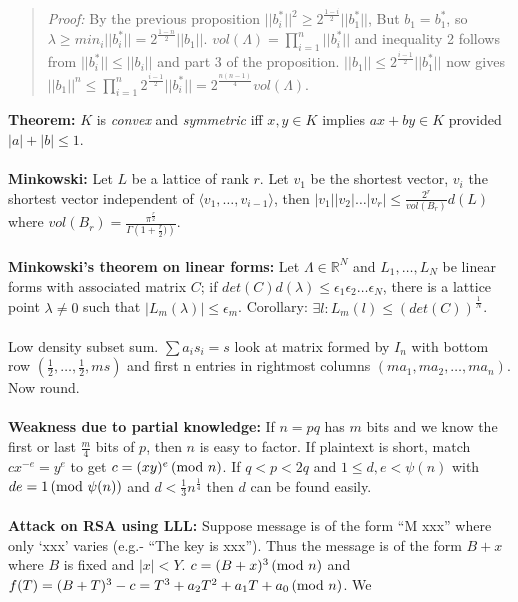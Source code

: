 \begin{quote}
\emph{Proof: }
By the previous proposition $||b_i^*||^2\geq2^{\frac {1-i} 2} ||b_1^*||$,  But $b_1 = b_1^*$,
so $\lambda \geq min_i ||b_i^*|| = 2^{\frac {1-n} 2} ||b_1||$.  $vol(\Lambda) = \prod_{i=1}^n ||b_i^*||$
and inequality 2 follows from $||b_i^*|| \leq ||b_i||$ and part 3 of the proposition.
$||b_1|| \leq 2^{\frac {i-1} 2} ||b_1^*||$ now gives
$||b_1||^n \leq \prod_{i=1}^n 2^{\frac {i-1} 2} ||b_i^*|| = 2^{\frac {n(n-1)} 4} vol(\Lambda)$.
\end{quote}
{\bf Theorem: }
$K$ is \emph{convex} and \emph{symmetric} iff $x, y \in K$
implies
$ax+by \in K$ provided $|a| + |b| \leq 1$.
\\
\\
{\bf Minkowski: } Let $L$ be a lattice of rank $r$.  Let $v_1$ be the shortest
vector,
$v_i$ the shortest vector independent of $\langle v_1, \ldots , v_{i-1} \rangle$, then
$|v_1 | |v_2 | \ldots |v_r | \leq {\frac {2^r} {vol(B_r)}} d(L)$ where
$vol(B_r)= {\frac {\pi^{\frac r 2}} {\Gamma(1+{\frac r 2)})}}$.
\\
\\
{\bf Minkowski's theorem on linear forms: }  Let $\Lambda \in
{\mathbb R}^N$ and $L_1, \ldots , L_N$ be linear forms with associated
matrix $C$;
if $det(C)d(\lambda) \leq \epsilon_1 \epsilon_2 \ldots \epsilon_N$,
there is a lattice point $\lambda \ne 0$ such that
$|L_m (\lambda)| \leq \epsilon_m$.   Corollary: $\exists l: L_m(l)
\leq (det(C))^{\frac 1 N}$.  \\
\\
Low density subset sum. $\sum a_i s_i = s$ look at matrix
formed by $I_n$
with bottom row $(\frac {1} {2} , \ldots , \frac {1} {2} , ms)$ and
first n entries in rightmost columns $(m a_1 , m a_2 , \ldots , m a_n )$.
Now round.
\\
\\
{\bf Weakness due to partial knowledge: }
If $n=pq$ has $m$ bits and we know the first or last ${\frac m 4}$ bits of $p$, then
$n$ is easy to factor.  If plaintext is short, match $c x^{-e} = y^e$ to get
$c=(xy)^e \thinspace \textnormal{(mod } n \textnormal{)}$.  If $q<p<2q$ and $1 \le d, e < \psi(n)$ with $de=1 \thinspace \textnormal{(mod } \psi(n) \textnormal{)}$ and
$d<{\frac 1 3} n^{\frac 1 4}$ then $d$ can be found easily.
\\
\\
{\bf Attack on RSA using LLL: }
 Suppose message is of the form ``M xxx'' where only `xxx' varies
(e.g.- ``The key is xxx'').  Thus the message is of the form $B+x$ where $B$ is fixed and
$|x|<Y$.  $c= (B+x)^3 \thinspace \textnormal{(mod } n \textnormal{)}$ and 
$f(T)= (B+T)^3-c= T^3+ a_2 T^2 + a_1 T + a_0 \thinspace \textnormal{(mod } n \textnormal{)}$. We 
